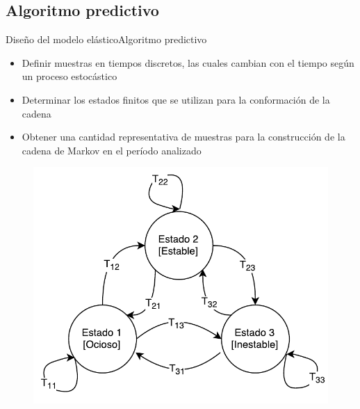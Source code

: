 \subsection*{Algoritmo predictivo}
\begin{frame}{Diseño del modelo elástico}{Algoritmo predictivo}
\begin{itemize}
	\item Definir muestras en tiempos discretos, las cuales cambian con el tiempo según un proceso estocástico
	\item Determinar los estados finitos que se utilizan para la conformación de la cadena
	\item Obtener una cantidad representativa de muestras para la construcción de la cadena de Markov en el período analizado
\end{itemize}

\begin{figure}[ht!]
  \centering
    \includegraphics[scale=0.35]{images/CadenaMarkovPredictiva.pdf}
\end{figure}

\end{frame}


